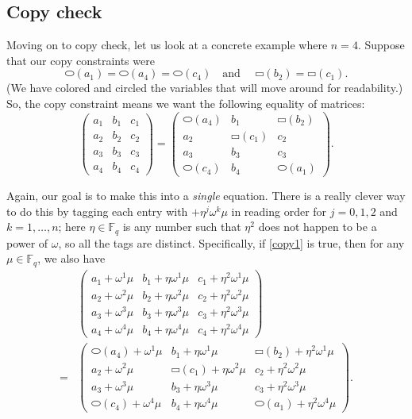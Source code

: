 \subsection{Copy check}

Moving on to copy check, let us look at a concrete example where
\(n = 4\). Suppose that our copy constraints were
\[{⬭(a_{1})} = {⬭(a_{4})} = {⬭(c_{4})}\quad\text{and }\quad{▭(b_{2})} = {▭(c_{1})}.\]
(We have colored and circled the variables that will move around for
readability.) So, the copy constraint means we want the following
equality of matrices: \[\begin{pmatrix}
a_{1} & b_{1} & c_{1} \\
a_{2} & b_{2} & c_{2} \\
a_{3} & b_{3} & c_{3} \\
a_{4} & b_{4} & c_{4}
\end{pmatrix} = \begin{pmatrix}
{⬭(a_{4})} & b_{1} & {▭(b_{2})} \\
a_{2} & {▭(c_{1})} & c_{2} \\
a_{3} & b_{3} & c_{3} \\
{⬭(c_{4})} & b_{4} & {⬭(a_{1})}
\end{pmatrix}.\] \label{copy1}{}

Again, our goal is to make this into a \emph{single} equation. There is
a really clever way to do this by tagging each entry with
\(+ \eta^{j}\omega^{k}\mu\) in reading order for \(j = 0,1,2\) and
\(k = 1,\ldots,n\); here \(\eta \in {\mathbb{F}}_{q}\) is any number
such that \(\eta^{2}\) does not happen to be a power of \(\omega\), so
all the tags are distinct. Specifically, if
\hyperref[copy1]{{[}copy1{]}} is true, then for any
\(\mu \in {\mathbb{F}}_{q}\), we also have \[\begin{aligned}
 & \begin{pmatrix}
a_{1} + \omega^{1}\mu & b_{1} + \eta\omega^{1}\mu & c_{1} + \eta^{2}\omega^{1}\mu \\
a_{2} + \omega^{2}\mu & b_{2} + \eta\omega^{2}\mu & c_{2} + \eta^{2}\omega^{2}\mu \\
a_{3} + \omega^{3}\mu & b_{3} + \eta\omega^{3}\mu & c_{3} + \eta^{2}\omega^{3}\mu \\
a_{4} + \omega^{4}\mu & b_{4} + \eta\omega^{4}\mu & c_{4} + \eta^{2}\omega^{4}\mu
\end{pmatrix} \\
 = & \begin{pmatrix}
{⬭(a_{4})} + \omega^{1}\mu & b_{1} + \eta\omega^{1}\mu & {▭(b_{2})} + \eta^{2}\omega^{1}\mu \\
a_{2} + \omega^{2}\mu & {▭(c_{1})} + \eta\omega^{2}\mu & c_{2} + \eta^{2}\omega^{2}\mu \\
a_{3} + \omega^{3}\mu & b_{3} + \eta\omega^{3}\mu & c_{3} + \eta^{2}\omega^{3}\mu \\
{⬭(c_{4})} + \omega^{4}\mu & b_{4} + \eta\omega^{4}\mu & {⬭(a_{1})} + \eta^{2}\omega^{4}\mu
\end{pmatrix}.
\end{aligned}\] \label{copy2}{}

